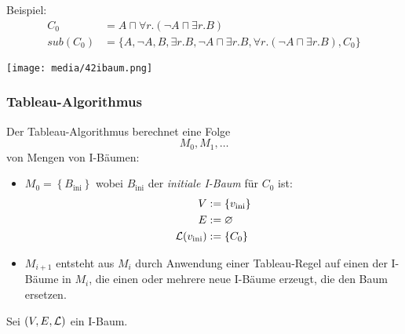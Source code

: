 \begin{tafel}
    Beispiel:
    \begin{align*}
        C_0 &= A \sqcap \forall r.(\neg A \sqcap \exists r.B)\\
        sub(C_0) &= \{A, \neg A, B, \exists r.B, \neg A \sqcap \exists r.B, \forall r.(\neg A \sqcap \exists r.B), C_0\}
    \end{align*}

    \texttt{[image: media/42ibaum.png]}
\end{tafel}

\subsubsection{Tableau-Algorithmus}\label{tableau-algorithmus}

Der Tableau-Algorithmus berechnet eine Folge $$M_0,M_1,\ldots$$ von Mengen von I-Bäumen:
\begin{itemize}
    \item $M_0 = \left\{ B_{\text{ini}} \right\}$ wobei $B_{\text{ini}}$ der \emph{initiale I-Baum} für $C_0$ ist:
        \begin{align*}
            V &:= \left\{ v_{\text{ini}} \right\}\\
            E &:= \emptyset\\
            \ML\left(v_{\text{ini}}\right) &:= \left\{ C_0 \right\}
        \end{align*}
    \item $M_{i + 1}$ entsteht aus $M_i$ durch Anwendung einer Tableau-Regel
        auf einen der I-Bäume in $M_i$, die einen oder mehrere neue I-Bäume
        erzeugt, die den Baum ersetzen.
\end{itemize}

Sei $\left( V,E,\ML \right)$ ein I-Baum.

